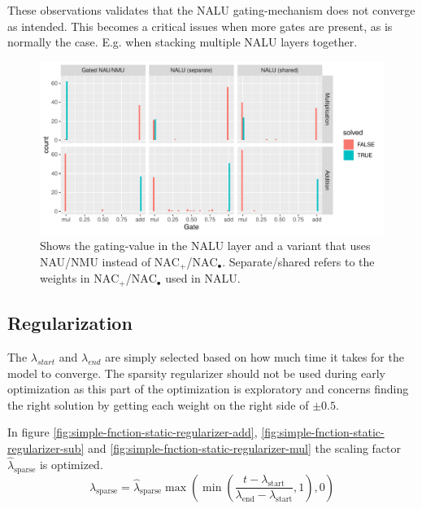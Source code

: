 These observations validates that the NALU gating-mechanism does not converge as intended. This becomes a critical issues when more gates are present, as is normally the case. E.g. when stacking multiple NALU layers together.

\begin{figure}[h]
\centering
\includegraphics[width=0.98\linewidth]{results/function_task_static_nalu.pdf}
\caption{Shows the gating-value in the NALU layer and a variant that uses NAU/NMU instead of $\mathrm{NAC}_{+}$/$\mathrm{NAC}_{\bullet}$. Separate/shared refers to the weights in $\mathrm{NAC}_{+}$/$\mathrm{NAC}_{\bullet}$ used in NALU.}
\label{fig:simple-function-static-nalu-gate-graph}
\end{figure}



\subsection{Regularization}
\label{sec:appendix:simple-function-task:regualization}

The $\lambda_{start}$ and $\lambda_{end}$ are simply selected based on how much time it takes for the model to converge. The sparsity regularizer should not be used during early optimization as this part of the optimization is exploratory and concerns finding the right solution by getting each weight on the right side of $\pm 0.5$.

In figure \ref{fig:simple-fnction-static-regularizer-add}, \ref{fig:simple-fnction-static-regularizer-sub} and \ref{fig:simple-fnction-static-regularizer-mul} the scaling factor $\hat{\lambda}_{\mathrm{sparse}}$ is optimized.
\begin{equation}
\lambda_{\mathrm{sparse}} = \hat{\lambda}_{\mathrm{sparse}} \max(\min(\frac{t - \lambda_{\mathrm{start}}}{\lambda_{\mathrm{end}} - \lambda_{\mathrm{start}}}, 1), 0)
\end{equation}

